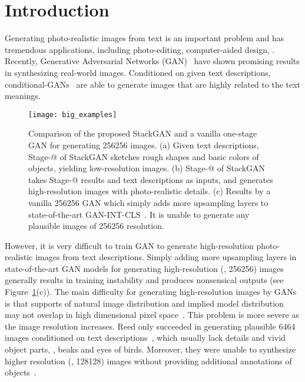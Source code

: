 \documentclass[10pt,twocolumn,letterpaper]{article}
\makeatletter
\newcommand{\Rmnum}[1]{\expandafter\@slowromancap\romannumeral #1@}
\makeatother
\begin{document}
\vspace{-8pt}
\section{Introduction}
\vspace{-5pt}

Generating photo-realistic images from text is an important problem and has tremendous applications, including photo-editing, computer-aided design, \etc. Recently, Generative Adversarial Networks (GAN)~\cite{goodfellow2014generative, DentonCSF15, Radford15} have shown promising results in synthesizing real-world images. Conditioned on given text descriptions, conditional-GANs~\cite{reed2016generative, reed2016learning} are able to generate images that are highly related to the text meanings.



\begin{figure}[bt]
\begin{center}
	\texttt{[image: big\_examples]}
\end{center}
\vspace{-8pt}
   \caption{
    Comparison of the proposed StackGAN and a vanilla one-stage GAN for generating 256256 images.    (a) Given text descriptions, Stage-\Rmnum{1} of StackGAN sketches rough shapes and basic colors of objects, yielding low-resolution images.    (b) Stage-\Rmnum{2} of StackGAN takes Stage-\Rmnum{1} results and text descriptions as inputs, and generates high-resolution images with photo-realistic details.    (c) Results by a vanilla 256256 GAN which simply adds more upsampling layers to state-of-the-art GAN-INT-CLS~\cite{reed2016generative}. It is unable to generate any plausible images of 256256 resolution.}
    \label{fig:big_examples}
\vspace{-8pt}
\end{figure}


However, it is very difficult to train GAN to generate high-resolution photo-realistic images from text descriptions. Simply adding more upsampling layers in state-of-the-art GAN models for generating high-resolution (\eg, 256256) images generally results in training instability and produces nonsensical outputs (see Figure~\ref{fig:big_examples}(c)). The main difficulty for generating high-resolution images by GANs is that supports of natural image distribution and implied model distribution may not overlap in high dimensional pixel space~\cite{Casper2016, ArjovskyB17}. This problem is more severe as the image resolution increases. Reed \etal only succeeded in generating plausible 6464 images conditioned on text descriptions~\cite{reed2016generative}, which usually lack details and vivid object parts, \eg, beaks and eyes of birds. Moreover, they were unable to synthesize higher resolution (\eg, 128128) images without providing additional annotations of objects~\cite{reed2016learning}.
\end{document}
